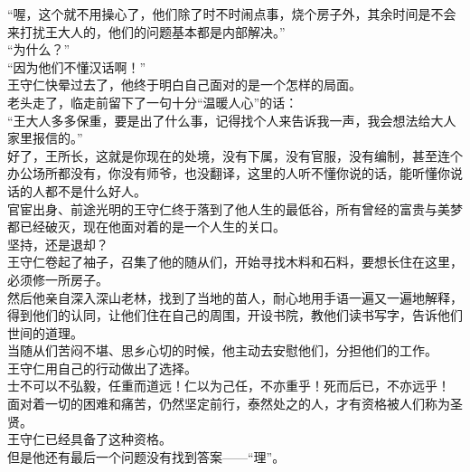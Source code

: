 \begin{multicols}{\theparacolNo}
“喔，这个就不用操心了，他们除了时不时闹点事，烧个房子外，其余时间是不会来打扰王大人的，他们的问题基本都是内部解决。”\\

“为什么？”\\

“因为他们不懂汉话啊！”\\

王守仁快晕过去了，他终于明白自己面对的是一个怎样的局面。\\

老头走了，临走前留下了一句十分“温暖人心”的话：\\

“王大人多多保重，要是出了什么事，记得找个人来告诉我一声，我会想法给大人家里报信的。”\\

好了，王所长，这就是你现在的处境，没有下属，没有官服，没有编制，甚至连个办公场所都没有，你没有师爷，也没翻译，这里的人听不懂你说的话，能听懂你说话的人都不是什么好人。\\

官宦出身、前途光明的王守仁终于落到了他人生的最低谷，所有曾经的富贵与美梦都已经破灭，现在他面对着的是一个人生的关口。\\

坚持，还是退却？\\

王守仁卷起了袖子，召集了他的随从们，开始寻找木料和石料，要想长住在这里，必须修一所房子。\\

然后他亲自深入深山老林，找到了当地的苗人，耐心地用手语一遍又一遍地解释，得到他们的认同，让他们住在自己的周围，开设书院，教他们读书写字，告诉他们世间的道理。\\

当随从们苦闷不堪、思乡心切的时候，他主动去安慰他们，分担他们的工作。\\

王守仁用自己的行动做出了选择。\\

士不可以不弘毅，任重而道远！仁以为己任，不亦重乎！死而后已，不亦远乎！\\

面对着一切的困难和痛苦，仍然坚定前行，泰然处之的人，才有资格被人们称为圣贤。\\

王守仁已经具备了这种资格。\\

但是他还有最后一个问题没有找到答案——“理”。\\


\end{multicols}
